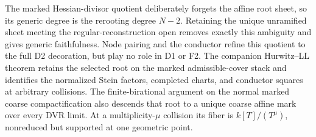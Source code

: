 \documentclass[11pt]{article}
\begin{document}
The marked Hessian-divisor quotient deliberately forgets the affine root
sheet, so its generic degree is the rerooting degree $N-2$.  Retaining the
unique unramified sheet meeting the regular-reconstruction open removes
exactly this ambiguity and gives generic faithfulness.  Node pairing and the
conductor refine this quotient to the full D2 decoration, but play no role in
D1 or F2.  The companion Hurwitz--LL theorem
retains the selected root on the marked admissible-cover stack and identifies
the normalized Stein factors, completed charts, and conductor squares at
arbitrary collisions.  The finite-birational argument on the normal marked
coarse compactification also descends that root to a unique coarse affine
mark over every DVR limit.  At a multiplicity-$\mu$ collision its fiber is
$k[T]/(T^\mu)$, nonreduced but supported at one geometric point.


\end{document}
